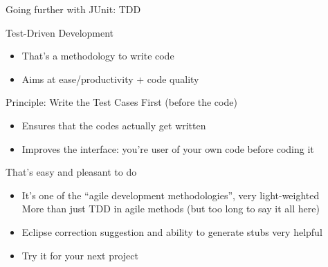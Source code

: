 \begin{frame}{Going further with JUnit: TDD}
  \begin{block}{Test-Driven Development}
    \begin{itemize}
    \item That's a methodology to write code
    \item Aims at ease/productivity + code quality
    \end{itemize}
  \end{block}
  \begin{block}{Principle: \alert{Write the Test Cases First} (before the code)}
    \begin{itemize}
    \item Ensures that the codes actually get written
    \item Improves the interface: you're user of your own code before coding it
    \end{itemize}
  \end{block}
  \begin{block}{That's easy and pleasant to do}
    \begin{itemize}
    \item It's one of the ``agile development methodologies'', very
      light-weighted\\
      {\small More than just TDD in agile methods (but too long to say it all here)}
    \item Eclipse correction suggestion and ability to generate stubs very
      helpful 
    \item Try it for your next project
    \end{itemize}
  \end{block}
\end{frame}
